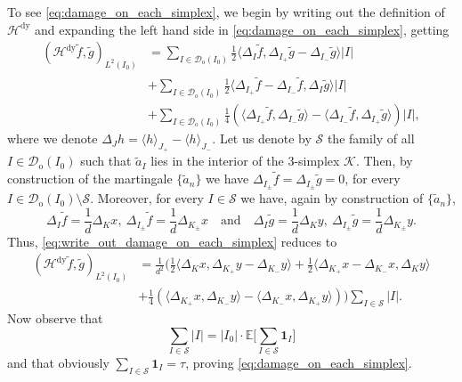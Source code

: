\documentclass{amsart}
\newcommand{\cD}{\mathcal{D}}
\newcommand{\wt}{\widetilde}
\theoremstyle{definition}
\theoremstyle{remark}
\begin{document}
To see \eqref{eq:damage_on_each_simplex}, we begin by writing out the definition of $\mathcal{H}^{\mathrm{dy}}$ and expanding the left hand side in \eqref{eq:damage_on_each_simplex}, getting
\begin{align}
    \label{eq:write_out_damage_on_each_simplex}
    (\mathcal{H}^{\mathrm{dy}}\wt f,\wt{g})_{L^2(I_0)}&=\sum_{I\in\cD_{\mathrm{o}}(I_0)}\frac{1}{2}\langle\Delta_{I}\wt{f},\Delta_{I_{+}}\wt{g}-\Delta_{I_{-}}\wt{g}\rangle|I|\\
    \nonumber&+\sum_{I\in\cD_{\mathrm{o}}(I_0)}\frac{1}{2}\langle\Delta_{I_{+}}\wt{f}-\Delta_{I_{-}}\wt{f},\Delta_{I}\wt{g}\rangle|I|\\
    \nonumber&+\sum_{I\in\cD_{\mathrm{o}}(I_0)}\frac{1}{4}(\langle\Delta_{I_{+}}\wt{f},\Delta_{I_{-}}\wt{g}\rangle-\langle\Delta_{I_{-}}\wt{f},\Delta_{I_{+}}\wt{g}\rangle)|I|,
\end{align}
where we denote $\Delta_{J}h=\langle h\rangle_{J_{+}}-\langle h\rangle_{J_{-}}$. Let us denote by $\mathcal{S}$ the family of all $I\in\cD_{\mathrm{o}}(I_0)$ such that $\wt{a}_{I}$ lies in the interior of the $3$-simplex $\mathscr{K}$. Then, by construction of the martingale $\{\wt{a}_n\}$ we have $\Delta_{I_{\pm}}\wt{f}=\Delta_{I_{\pm}}\wt{g}=0$, for every $I\in\cD_{\mathrm{o}}(I_0)\setminus\mathcal{S}$. Moreover, for every $I\in\mathcal{S}$ we have, again by construction of $\{\wt{a}_n\}$,
\begin{equation*}
    \Delta_{I}\wt{f}=\frac{1}{d}\Delta_{K}x,~\Delta_{I_{\pm}}\wt{f}=\frac{1}{d}\Delta_{K_{\pm}}x\quad\text{and}\quad\Delta_{I}\wt{g}=\frac{1}{d}\Delta_{K}y,~\Delta_{I_{\pm}}\wt{g}=\frac{1}{d}\Delta_{K_{\pm}}y.
\end{equation*}
Thus, \eqref{eq:write_out_damage_on_each_simplex} reduces to
\begin{align}
    \label{eq:damage_on_each_simplex_intervals}
    (\mathcal{H}^{\mathrm{dy}}\wt f,\wt{g})_{L^2(I_0)}&=\frac{1}{d^2}\bigg(\frac{1}{2}\langle\Delta_{K}x,\Delta_{K_{+}}y-\Delta_{K_{-}}y\rangle
    +\frac{1}{2}\langle\Delta_{K_{+}}x-\Delta_{K_{-}}x,\Delta_{K}y\rangle\\
    \
    \nonumber&+\frac{1}{4}(\langle\Delta_{K_{+}}x,\Delta_{K_{-}}y\rangle-\langle\Delta_{K_{-}}x,\Delta_{K_{+}}y\rangle)\bigg)\sum_{I\in\mathcal{S}}|I|.
\end{align}
Now observe that
\begin{equation*}
    \sum_{I\in\mathcal{S}}|I|=|I_0|\cdot\mathbb{E}\bigg[\sum_{I\in\mathcal{S}}\mathbf{1}_{I}\bigg]
\end{equation*}
and that obviously $\sum_{I\in\mathcal{S}}\mathbf{1}_{I}=\tau$, proving \eqref{eq:damage_on_each_simplex}.
\end{document}
